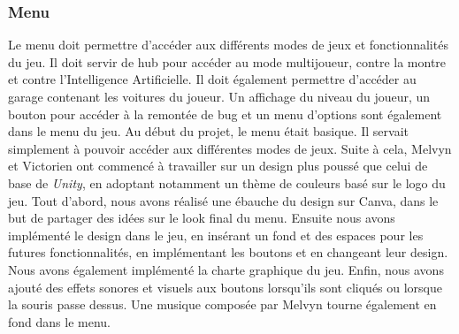 \documentclass[a4paper,12pt]{article}
\newcommand{\AI}{Intelligence Artificielle}
\begin{document}
            \subsubsection{Menu}
                Le menu doit permettre d'accéder aux différents modes de jeux et fonctionnalités du jeu.
                Il doit servir de hub pour accéder au mode multijoueur, contre la montre et contre l'\AI.
                Il doit également permettre d'accéder au garage contenant les voitures du joueur. Un affichage
                du niveau du joueur, un bouton pour accéder à la remontée de bug et un menu d'options 
                sont également dans le menu du jeu. Au début du projet, le menu était basique. Il servait 
                simplement à pouvoir accéder aux différentes modes de jeux. Suite à cela, Melvyn et Victorien 
                ont commencé à travailler sur un design plus poussé que celui de base de \textsl{Unity}, 
                en adoptant notamment un thème de couleurs basé sur le logo du jeu. Tout d'abord, nous avons 
                réalisé une ébauche du design sur Canva, dans le but de partager des idées sur le look
                final du menu. Ensuite nous avons implémenté le design dans le jeu, en insérant un fond
                et des espaces pour les futures fonctionnalités, en implémentant les boutons et en changeant
                leur design. Nous avons également implémenté la charte graphique du jeu. Enfin, nous avons 
                ajouté des effets sonores et visuels aux boutons lorsqu'ils sont cliqués ou lorsque
                la souris passe dessus. Une musique composée par Melvyn tourne également en fond dans le menu.
\end{document}
